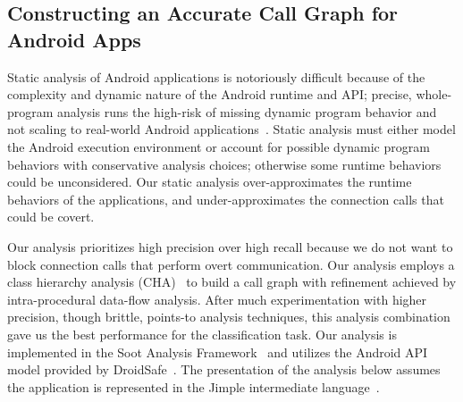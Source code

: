 


\subsection{Constructing an Accurate Call Graph for Android Apps }

Static analysis of Android applications is notoriously difficult
because of the complexity and dynamic nature of the Android runtime
and API; precise, whole-program analysis runs the high-risk of missing
dynamic program behavior and not scaling to real-world Android
applications~\cite{Gordon:Kim:Perkins:Gilham:Nguyen:Rinard:NDSS15}.
Static analysis must either model the Android execution
environment or account for possible dynamic program behaviors with
conservative analysis choices; otherwise some runtime behaviors could
be unconsidered.  Our static analysis over-approximates the runtime
behaviors of the applications, and under-approximates the connection
calls that could be covert.
 
Our analysis prioritizes high precision over high recall because we do
not want to block connection calls that perform overt
communication. Our analysis employs a class hierarchy analysis
(CHA)~\cite{Dean1995} to build a call graph with refinement achieved
by intra-procedural data-flow analysis.  After much experimentation
with higher precision, though brittle, points-to analysis techniques,
this analysis combination gave us the best performance for the
classification task.  Our analysis is implemented in the Soot Analysis
Framework~\cite{Vallee-Rai2000} and utilizes the Android API model
provided by
DroidSafe~\cite{Gordon:Kim:Perkins:Gilham:Nguyen:Rinard:NDSS15}. The
presentation of the analysis below assumes the application is
represented in the Jimple intermediate language~\cite{Vallee-Rai2000}.


